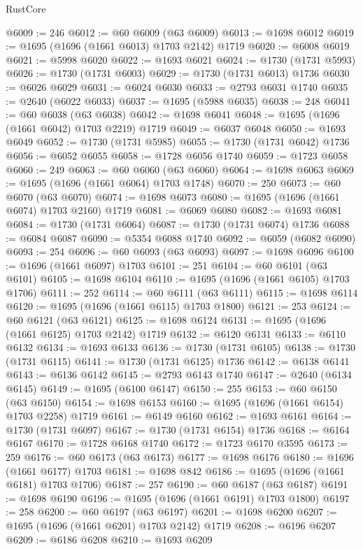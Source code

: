 \begin{lexlean}{RustCore}
\begin{coremodule}
@6009 := 246
@6012 := @60 @6009 (@63 @6009)
@6013 := @1698 @6012
@6019 := @1695 (@1696 (@1661 @6013) @1703 @2142) @1719
@6020 := @6008 @6019
@6021 := @5998 @6020
@6022 := @1693 @6021
@6024 := @1730 (@1731 @5993)
@6026 := @1730 (@1731 @6003)
@6029 := @1730 (@1731 @6013) @1736
@6030 := @6026 @6029
@6031 := @6024 @6030
@6033 := @2793 @6031 @1740
@6035 := @2640 (@6022 @6033)
@6037 := @1695 (@5988 @6035)
@6038 := 248
@6041 := @60 @6038 (@63 @6038)
@6042 := @1698 @6041
@6048 := @1695 (@1696 (@1661 @6042) @1703 @2219) @1719
@6049 := @6037 @6048
@6050 := @1693 @6049
@6052 := @1730 (@1731 @5985)
@6055 := @1730 (@1731 @6042) @1736
@6056 := @6052 @6055
@6058 := @1728 @6056 @1740
@6059 := @1723 @6058
@6060 := 249
@6063 := @60 @6060 (@63 @6060)
@6064 := @1698 @6063
@6069 := @1695 (@1696 (@1661 @6064) @1703 @1748)
@6070 := 250
@6073 := @60 @6070 (@63 @6070)
@6074 := @1698 @6073
@6080 := @1695 (@1696 (@1661 @6074) @1703 @2160) @1719
@6081 := @6069 @6080
@6082 := @1693 @6081
@6084 := @1730 (@1731 @6064)
@6087 := @1730 (@1731 @6074) @1736
@6088 := @6084 @6087
@6090 := @5354 @6088 @1740
@6092 := @6059 (@6082 @6090)
@6093 := 254
@6096 := @60 @6093 (@63 @6093)
@6097 := @1698 @6096
@6100 := @1696 (@1661 @6097) @1703
@6101 := 251
@6104 := @60 @6101 (@63 @6101)
@6105 := @1698 @6104
@6110 := @1695 (@1696 (@1661 @6105) @1703 @1706)
@6111 := 252
@6114 := @60 @6111 (@63 @6111)
@6115 := @1698 @6114
@6120 := @1695 (@1696 (@1661 @6115) @1703 @1800)
@6121 := 253
@6124 := @60 @6121 (@63 @6121)
@6125 := @1698 @6124
@6131 := @1695 (@1696 (@1661 @6125) @1703 @2142) @1719
@6132 := @6120 @6131
@6133 := @6110 @6132
@6134 := @1693 @6133
@6136 := @1730 (@1731 @6105)
@6138 := @1730 (@1731 @6115)
@6141 := @1730 (@1731 @6125) @1736
@6142 := @6138 @6141
@6143 := @6136 @6142
@6145 := @2793 @6143 @1740
@6147 := @2640 (@6134 @6145)
@6149 := @1695 (@6100 @6147)
@6150 := 255
@6153 := @60 @6150 (@63 @6150)
@6154 := @1698 @6153
@6160 := @1695 (@1696 (@1661 @6154) @1703 @2258) @1719
@6161 := @6149 @6160
@6162 := @1693 @6161
@6164 := @1730 (@1731 @6097)
@6167 := @1730 (@1731 @6154) @1736
@6168 := @6164 @6167
@6170 := @1728 @6168 @1740
@6172 := @1723 @6170 @3595
@6173 := 259
@6176 := @60 @6173 (@63 @6173)
@6177 := @1698 @6176
@6180 := @1696 (@1661 @6177) @1703
@6181 := @1698 @842
@6186 := @1695 (@1696 (@1661 @6181) @1703 @1706)
@6187 := 257
@6190 := @60 @6187 (@63 @6187)
@6191 := @1698 @6190
@6196 := @1695 (@1696 (@1661 @6191) @1703 @1800)
@6197 := 258
@6200 := @60 @6197 (@63 @6197)
@6201 := @1698 @6200
@6207 := @1695 (@1696 (@1661 @6201) @1703 @2142) @1719
@6208 := @6196 @6207
@6209 := @6186 @6208
@6210 := @1693 @6209

\end{coremodule}
\end{lexlean}
